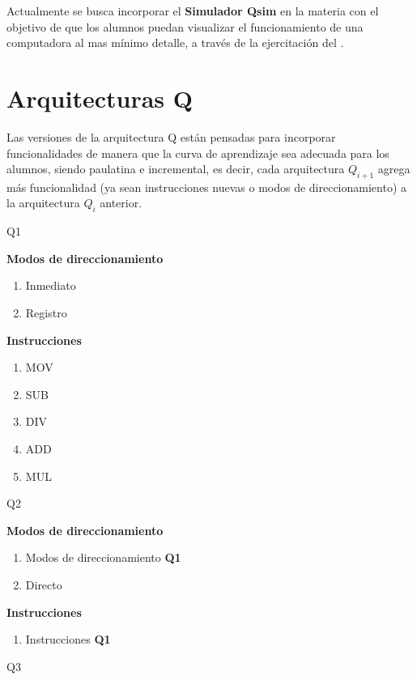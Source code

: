 Actualmente se busca incorporar el \textbf{Simulador Qsim} en la materia con el objetivo de que los alumnos puedan visualizar el funcionamiento de una computadora al mas mínimo detalle, a través de la ejercitación del \ciclo.

\section{Arquitecturas Q}

Las versiones de la arquitectura Q están pensadas para incorporar funcionalidades de manera que la curva de aprendizaje sea adecuada para los alumnos, siendo paulatina e incremental, es decir, cada arquitectura $Q_{i+1}$ agrega más funcionalidad (ya sean instrucciones nuevas o modos de direccionamiento) a la arquitectura  $Q_{i}$ anterior.


{Q1}


\textbf{Modos de direccionamiento}
\begin{enumerate}
\item Inmediato
\item Registro
\end{enumerate}

\textbf{Instrucciones}
\begin{enumerate}
\item MOV
\item SUB 
\item DIV 
\item ADD 
\item MUL
\end{enumerate}


{Q2}

\textbf{Modos de direccionamiento}
\begin{enumerate}
\item Modos de direccionamiento \textbf{Q1}
\item Directo 
\end{enumerate}

\textbf{Instrucciones}
\begin{enumerate}
\item Instrucciones \textbf{Q1}
\end{enumerate}

{Q3}

